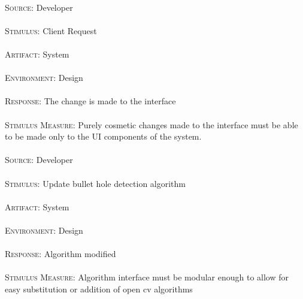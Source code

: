 \paragraph{}\textsc{Source:} Developer
\paragraph{}\textsc{Stimulus:} Client Request
\paragraph{}\textsc{Artifact:} System
\paragraph{}\textsc{Environment:} Design
\paragraph{}\textsc{Response:} The change is made to the interface
\paragraph{}\textsc{Stimulus Measure:} Purely cosmetic changes made to the interface must be able to be made only to the UI components of the system.

\paragraph{}\textsc{Source:} Developer
\paragraph{}\textsc{Stimulus:} Update bullet hole detection algorithm
\paragraph{}\textsc{Artifact:} System
\paragraph{}\textsc{Environment:} Design
\paragraph{}\textsc{Response:} Algorithm modified
\paragraph{}\textsc{Stimulus Measure:} Algorithm interface must be modular enough to allow for easy substitution or addition of open cv algorithms

